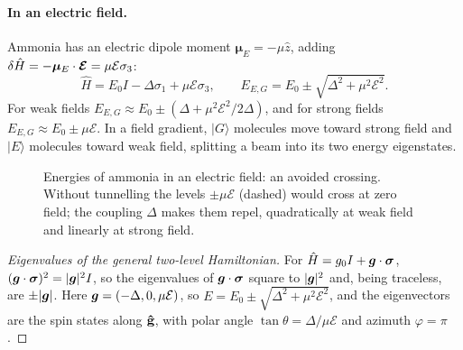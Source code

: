 \paragraph{In an electric field.} Ammonia has an electric dipole moment $\bm{\mu}_E = -\mu\hat{z}$, adding $\delta\hat{H} = -\bm{\mu}_E\cdot\vect{\mathcal{E}} = \mu\mathcal{E}\sigma_3$:
\[
    \hat{H} = E_0I - \Delta\sigma_1 + \mu\mathcal{E}\sigma_3,
    \qquad
    E_{E,G} = E_0\pm\sqrt{\Delta^2 + \mu^2\mathcal{E}^2}.
\]
For weak fields $E_{E,G}\approx E_0\pm(\Delta + \mu^2\mathcal{E}^2/2\Delta)$, and for strong fields $E_{E,G}\approx E_0\pm\mu\mathcal{E}$. In a field gradient, $|G\rangle$ molecules move toward strong field and $|E\rangle$ molecules toward weak field, splitting a beam into its two energy eigenstates.

\begin{figure}[ht]
\centering
{}
\caption{Energies of ammonia in an electric field: an avoided crossing. Without tunnelling the levels $\pm\mu\mathcal{E}$ (dashed) would cross at zero field; the coupling $\Delta$ makes them repel, quadratically at weak field and linearly at strong field.}
\end{figure}

\begin{proof}[Eigenvalues of the general two-level Hamiltonian]
For $\hat{H} = g_0I + \bm{g}\cdot\bm{\sigma}$, $(\bm{g}\cdot\bm{\sigma})^2 = |\bm{g}|^2I$, so the eigenvalues of $\bm{g}\cdot\bm{\sigma}$ square to $|\bm{g}|^2$ and, being traceless, are $\pm|\bm{g}|$. Here $\bm{g} = (-\Delta,0,\mu\mathcal{E})$, so $E = E_0\pm\sqrt{\Delta^2+\mu^2\mathcal{E}^2}$, and the eigenvectors are the spin states along $\boldsymbol{\hat{\textbf{g}}}$, with polar angle $\tan\theta = \Delta/\mu\mathcal{E}$ and azimuth $\varphi = \pi$.
\end{proof}

